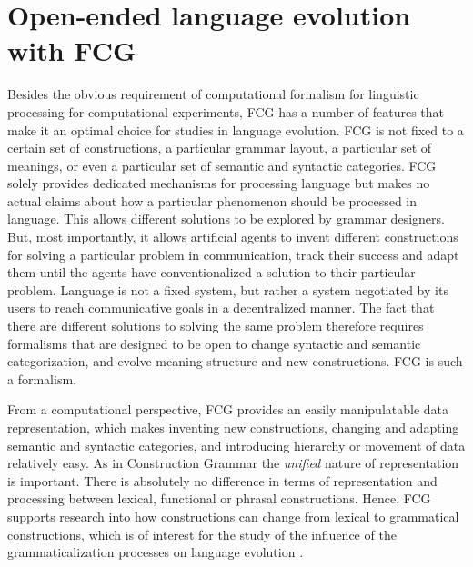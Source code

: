 \section{Open-ended language evolution with FCG}
Besides the obvious requirement of computational
formalism for linguistic processing for computational
experiments, FCG has a number
of features that make it an optimal choice for studies
in language evolution. FCG is not fixed to a certain
set of constructions, a particular grammar layout, 
a particular set of meanings,
or even a particular set of semantic and syntactic 
categories. FCG solely provides 
dedicated mechanisms for processing language but
makes no actual claims about how a particular
phenomenon should be processed in language. 
This allows different 
solutions to be explored by grammar designers.
But, most importantly, it allows artificial agents
to invent different constructions for solving a particular
problem in communication, track their success and
adapt them until the agents have conventionalized
a solution to their particular problem. 
Language is not a fixed system, but
rather a system negotiated by its users to reach
communicative goals in a decentralized manner. 
The fact that there are different solutions to solving
the same problem therefore requires formalisms
that are designed to be open to change syntactic and 
semantic categorization, and evolve meaning
structure and new constructions. FCG is such a formalism.

From a computational perspective, FCG provides
an easily manipulatable data representation, which makes 
inventing new constructions, changing and
adapting semantic and syntactic categories, and
introducing hierarchy or movement of data relatively easy.
As in Construction Grammar the \emph{unified} nature
of representation is important. There is absolutely
no difference in terms of representation and processing 
between lexical, functional or phrasal constructions. Hence, FCG
supports research into how constructions can change 
from lexical to grammatical constructions, which is 
of interest for the study of the influence of the grammaticalization 
processes on language evolution \citep{traugott1991grammaticalization}.

